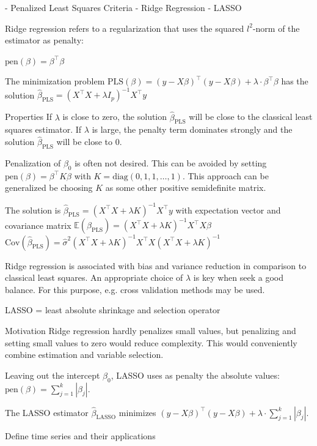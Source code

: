 - Penalized Least Squares Criteria
- Ridge Regression
- LASSO


Ridge regression refers to a regularization that uses the squared \(l^2\)-norm of the estimator as penalty:

\(\text{pen}(\beta) = \beta^\top \beta\)

The minimization problem 
\(\text{PLS}(\beta) = (y - X \beta)^\top (y - X \beta) + \lambda \cdot \beta^\top \beta\)
has the solution
\(\hat{\beta}_{\text{PLS}} = (X^\top X + \lambda I_p)^{-1} X^\top y\)

Properties
If \(\lambda\) is close to zero, the solution \(\hat{\beta}_{\text{PLS}}\) will be close to the classical least squares estimator.
If \(\lambda\) is large, the penalty term dominates strongly and the solution \(\hat{\beta}_{\text{PLS}}\) will be close to 0.

Penalization of \(\beta_0\) is often not desired. This can be avoided by setting
\(\text{pen}(\beta) = \beta^\top K \beta\)
with \(K = \text{diag}(0, 1, 1, \dots, 1)\).
This approach can be generalized be choosing \(K\) as some other positive semidefinite matrix.

The solution is
\(\hat{\beta}_{\text{PLS}} = (X^\top X + \lambda K)^{-1} X^\top y\)
with expectation vector and covariance matrix
\(\mathbb{E}(\hat{\beta}_{\text{PLS}}) = (X^\top X + \lambda K)^{-1} X^\top X \beta\)
\(\text{Cov}(\hat{\beta}_{\text{PLS}}) = \hat{\sigma}^2 (X^\top X + \lambda K)^{-1} X^\top X (X^\top X + \lambda K)^{-1}\)

Ridge regression is associated with bias and variance reduction in comparison to classical least squares. 
An appropriate choice of \(\lambda\) is key when seek a good balance. For this purpose, e.g. cross validation methods may be used.


LASSO = least absolute shrinkage and selection operator

Motivation
Ridge regression hardly penalizes small values, but penalizing and setting small values to zero would reduce complexity.
This would conveniently combine estimation and variable selection.

Leaving out the intercept \(\beta_0\), LASSO uses as penalty the absolute values:
\(\text{pen}(\beta) = \sum_{j = 1}^k |\beta_j|.\)

The LASSO estimator \(\hat{\beta}_{\text{LASSO}}\) minimizes
\((y - X \beta)^\top (y - X \beta) + \lambda \cdot \sum_{j = 1}^k |\beta_j|.\)



Define time series and their applications

